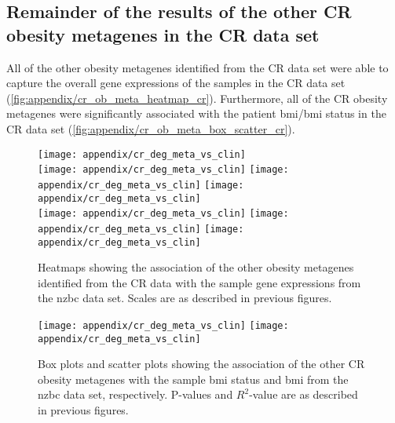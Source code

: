\begin{appendices}
	\section{Remainder of the results of the other CR obesity metagenes in the CR data set}
	\label{sec:rest_of_the_cr_ob_meta_heatmap_results_cr}

	All of the other obesity metagenes identified from the CR data set were able to capture the overall gene expressions of the samples in the CR data set (\cref{fig:appendix/cr_ob_meta_heatmap_cr}).
	Furthermore, all of the CR obesity metagenes were significantly associated with the patient \gls{bmi}/\gls{bmi} status in the CR data set (\cref{fig:appendix/cr_ob_meta_box_scatter_cr}).

	\begin{figure}[htp!]
		\centering
		\texttt{[image: appendix/cr\_deg\_meta\_vs\_clin]}\\
		\texttt{[image: appendix/cr\_deg\_meta\_vs\_clin]}
		\texttt{[image: appendix/cr\_deg\_meta\_vs\_clin]}
		\texttt{[image: appendix/cr\_deg\_meta\_vs\_clin]}\\
		\texttt{[image: appendix/cr\_deg\_meta\_vs\_clin]}
		\texttt{[image: appendix/cr\_deg\_meta\_vs\_clin]}
		\texttt{[image: appendix/cr\_deg\_meta\_vs\_clin]}\\
		\caption[Association of the other CR obesity metagenes with the sample gene expressions in the \gls{nzbc} data]{Heatmaps showing the association of the other obesity metagenes identified from the CR data with the sample gene expressions from the \gls{nzbc} data set.
		Scales are as described in previous figures.}
		\label{fig:appendix/cr_ob_meta_heatmap_cris}
	\end{figure}

	\begin{figure}[htpb]
		\centering
		\texttt{[image: appendix/cr\_deg\_meta\_vs\_clin]}
		\hfill
		\texttt{[image: appendix/cr\_deg\_meta\_vs\_clin]}\\
		\caption[Association of the other CR obesity metagenes with the sample \gls{bmi}/\gls{bmi} status in the \gls{nzbc} data]{Box plots and scatter plots showing the association of the other CR obesity metagenes with the sample \gls{bmi} status  and \gls{bmi} from the \gls{nzbc} data set, respectively.
		P-values and $R^2$-value are as described in previous figures.}
		\label{fig:appendix/cr_ob_meta_box_scatter_cris}
	\end{figure}


\end{appendices}
